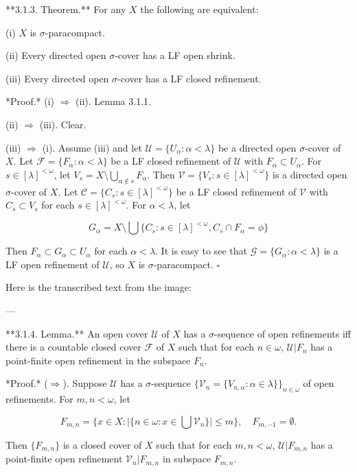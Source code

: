 \documentclass[main.tex]{subfiles}
\begin{document}
**3.1.3. Theorem.** For any $X$ the following are equivalent:

(i) $X$ is $\sigma$-paracompact.

(ii) Every directed open $\sigma$-cover has a LF open shrink.

(iii) Every directed open $\sigma$-cover has a LF closed refinement.

*Proof.* (i) $\Rightarrow$ (ii). Lemma 3.1.1.

(ii) $\Rightarrow$ (iii). Clear.

(iii) $\Rightarrow$ (i). Assume (iii) and let $\mathscr{U} = \{U_\alpha : \alpha < \lambda\}$ be a directed open $\sigma$-cover of $X$. Let $\mathscr{F} = \{F_\alpha : \alpha < \lambda\}$ be a LF closed refinement of $\mathscr{U}$ with $F_\alpha \subset U_\alpha$. For $s \in [\lambda]^{<\omega}$, let $V_s = X \setminus \bigcup_{\alpha \notin s} F_\alpha$. Then $\mathscr{V} = \{V_s : s \in [\lambda]^{<\omega}\}$ is a directed open $\sigma$-cover of $X$. Let $\mathscr{C} = \{C_s : s \in [\lambda]^{<\omega}\}$ be a LF closed refinement of $\mathscr{V}$ with $C_s \subset V_s$ for each $s \in [\lambda]^{<\omega}$. For $\alpha < \lambda$, let

$$G_\alpha = X \setminus \bigcup \{C_s : s \in [\lambda]^{<\omega}, C_s \cap F_\alpha = \phi\}$$

Then $F_\alpha \subset G_\alpha \subset U_\alpha$ for each $\alpha < \lambda$. It is easy to see that $\mathscr{G} = \{G_\alpha : \alpha < \lambda\}$ is a LF open refinement of $\mathscr{U}$, so $X$ is $\sigma$-paracompact. $\square$

Here is the transcribed text from the image:

---

**3.1.4. Lemma.** An open cover $\mathscr{U}$ of $X$ has a $\sigma$-sequence of open refinements iff there is a countable closed cover $\mathscr{F}$ of $X$ such that for each $n \in \omega$, $\mathscr{U} \vert{} F_n$ has a point-finite open refinement in the subspace $F_n$.

*Proof.* ($\Rightarrow$). Suppose $\mathscr{U}$ has a $\sigma$-sequence $\{\mathscr{V}_n = \{V_{n,\alpha} : \alpha \in \lambda\}\}_{n \in \omega}$ of open refinements. For $m, n < \omega$, let


$$F_{m,n} = \{x \in X : \vert{}\{n \in \omega : x \in \bigcup \mathscr{V}_n\}\vert{} \le m\}, \quad F_{m,-1} = \emptyset.$$

Then $\{F_{m,n}\}$ is a closed cover of $X$ such that for each $m, n < \omega$, $\mathscr{U} \vert{} F_{m,n}$ has a point-finite open refinement $\mathscr{V}_n \vert{} F_{m,n}$ in subspace $F_{m,n}$.
\end{document}
